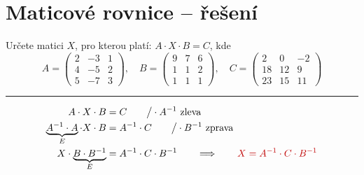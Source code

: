 \documentclass[10pt,a4paper]{article}
\newcommand{\pozn}[1]{{\color{red!75!black}#1}}
\begin{document}
\section*{Maticové rovnice -- řešení}

Určete matici $X$, pro kterou platí: \quad $A\cdot X\cdot B=C$, \quad kde
\[
A=\begin{pmatrix} 2 & -3 & 1\\ 4 & -5 & 2\\ 5 & -7 & 3 \end{pmatrix},\quad
B=\begin{pmatrix} 9 & 7 & 6\\ 1 & 1 & 2\\ 1 & 1 & 1 \end{pmatrix},\quad
C=\begin{pmatrix} 2 & 0 & -2\\ 18 & 12 & 9\\ 23 & 15 & 11 \end{pmatrix}
\]
\hrule
\begin{align*}
A\cdot X\cdot B &= C \qquad \big/\cdot A^{-1}\ \text{zleva}\\
\underbrace{A^{-1}\cdot A}_{E}\cdot X\cdot B &= A^{-1}\cdot C \qquad \big/\cdot B^{-1}\ \text{zprava}\\
X\cdot\underbrace{B\cdot B^{-1}}_{E} &= A^{-1}\cdot C\cdot B^{-1} \qquad\Longrightarrow\qquad \pozn{X=A^{-1}\cdot C\cdot B^{-1}}
\end{align*}
\end{document}
